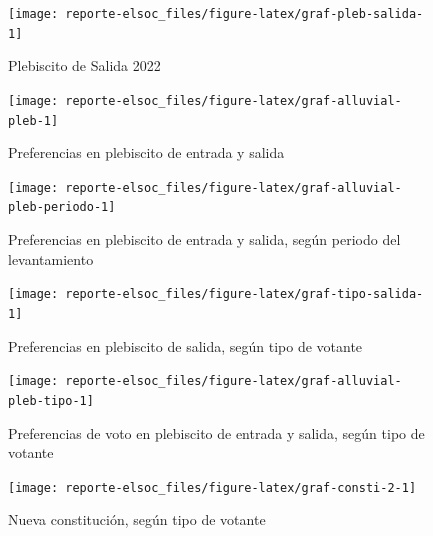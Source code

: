 \documentclass[
  12pt,
]{book}
\begin{document}
\begin{figure}

{\centering \texttt{[image: reporte-elsoc\_files/figure-latex/graf-pleb-salida-1]} 

}

\caption{Plebiscito de Salida 2022}\label{fig:graf-pleb-salida}
\end{figure}

\begin{figure}

{\centering \texttt{[image: reporte-elsoc\_files/figure-latex/graf-alluvial-pleb-1]} 

}

\caption{Preferencias en plebiscito de entrada y salida}\label{fig:graf-alluvial-pleb}
\end{figure}

\begin{figure}

{\centering \texttt{[image: reporte-elsoc\_files/figure-latex/graf-alluvial-pleb-periodo-1]} 

}

\caption{Preferencias en plebiscito de entrada y salida, según periodo del levantamiento}\label{fig:graf-alluvial-pleb-periodo}
\end{figure}

\begin{figure}

{\centering \texttt{[image: reporte-elsoc\_files/figure-latex/graf-tipo-salida-1]} 

}

\caption{Preferencias en plebiscito de salida, según tipo de votante}\label{fig:graf-tipo-salida}
\end{figure}

\begin{figure}

{\centering \texttt{[image: reporte-elsoc\_files/figure-latex/graf-alluvial-pleb-tipo-1]} 

}

\caption{Preferencias de voto en plebiscito de entrada y salida, según tipo de votante}\label{fig:graf-alluvial-pleb-tipo}
\end{figure}

\begin{figure}

{\centering \texttt{[image: reporte-elsoc\_files/figure-latex/graf-consti-2-1]} 

}

\caption{Nueva constitución, según tipo de votante}\label{fig:graf-consti-2}
\end{figure}
\end{document}
